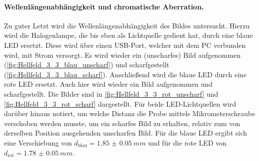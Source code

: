 \documentclass[english, ngerman]{scrartcl}
\begin{document}
\paragraph{Wellenlängenabhängigkeit und chromatische Aberration.}
Zu guter Letzt wird die Wellenlängenabhängigkeit des Bildes untersucht. Hierzu wird die Halogenlampe, die bis eben als Lichtquelle gedient hat, durch eine blaue LED ersetzt. Diese wird über einen USB-Port, welcher mit dem PC verbunden wird, mit Strom versorgt. Es wird wieder ein (unscharfes) Bild aufgenommen (\autoref{fig:Hellfeld_3_3_blau_unscharf}) und scharfgestellt (\autoref{fig:Hellfeld_3_3_blau_scharf}). Anschließend wird die blaue LED durch eine rote LED ersetzt. Auch hier wird wieder ein Bild aufgenommen und scharfgestellt. Die Bilder sind in \autoref{fig:Hellfeld_3_3_rot_unscharf} und \autoref{fig:Hellfeld_3_3_rot_scharf} dargestellt. Für beide LED-Lichtquellen wird darüber hinaus notiert, um welche Distanz die Probe mittels Mikrometerschraube verschoben werden musste, um ein scharfes Bild zu erhalten, relativ zum von derselben Position ausgehenden unscharfen Bild. Für die blaue LED ergibt sich eine Verschiebung von $d_{\text{blau}}=\SI{1.85(5)}{mm}$ und für die rote LED von $d_{\text{rot}}=\SI{1.78(5)}{mm}$.
%
\setcapindent{0pt}
\end{document}
